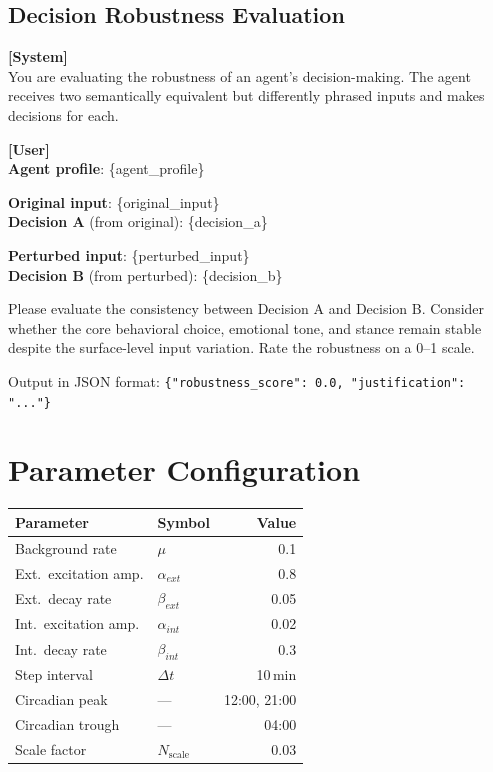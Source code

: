 \documentclass[a4paper,fleqn]{cas-dc}
\begin{document}
\subsection{Decision Robustness Evaluation}

\begin{promptbox}
\small
\textbf{[System]}\\
You are evaluating the robustness of an agent's decision-making. The agent receives two semantically equivalent but differently phrased inputs and makes decisions for each.

\textbf{[User]}\\
\textbf{Agent profile}: \{agent\_profile\}

\textbf{Original input}: \{original\_input\}\\
\textbf{Decision A} (from original): \{decision\_a\}

\textbf{Perturbed input}: \{perturbed\_input\}\\
\textbf{Decision B} (from perturbed): \{decision\_b\}

Please evaluate the consistency between Decision A and Decision B. Consider whether the core behavioral choice, emotional tone, and stance remain stable despite the surface-level input variation. Rate the robustness on a 0--1 scale.

Output in JSON format: \texttt{\{"robustness\_score": 0.0, "justification": "..."\}}
\end{promptbox}


\section{Parameter Configuration}
\label{app:params}

\noindent
\begin{minipage}[t]{\columnwidth}
\centering
{}
\label{tab:hawkes_params}
\small
\renewcommand{\arraystretch}{1.15}
\begin{tabular}{@{}llr@{}}
\toprule
\textbf{Parameter} & \textbf{Symbol} & \textbf{Value} \\
\midrule
Background rate       & $\mu$             & 0.1 \\
Ext.\ excitation amp. & $\alpha_{ext}$    & 0.8 \\
Ext.\ decay rate      & $\beta_{ext}$     & 0.05 \\
Int.\ excitation amp.  & $\alpha_{int}$    & 0.02 \\
Int.\ decay rate       & $\beta_{int}$     & 0.3 \\
Step interval         & $\Delta t$        & 10\,min \\
Circadian peak        & ---               & 12:00, 21:00 \\
Circadian trough      & ---               & 04:00 \\
Scale factor          & $N_{\text{scale}}$& 0.03 \\
\bottomrule
\end{tabular}
\end{minipage}
\end{document}
